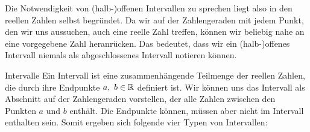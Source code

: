\documentclass[../../main.tex]{subfiles}
\begin{document}
	Die Notwendigkeit von (halb-)offenen Intervallen zu sprechen liegt also in den reellen Zahlen selbst begründet. Da wir auf der Zahlengeraden mit jedem Punkt, den wir uns aussuchen, auch eine reelle Zahl treffen, können wir beliebig nahe an eine vorgegebene Zahl heranrücken. Das bedeutet, dass wir ein (halb-)offenes Intervall niemals als abgeschlossenes Intervall notieren können.
\begin{samepage}
	\begin{nutshell}{Intervalle}
		Ein Intervall ist eine zusammenhängende Teilmenge der reellen Zahlen, die durch ihre Endpunkte $a,\ b\in\mathbb{R}$ definiert ist. Wir können uns das Intervall als Abschnitt auf der Zahlengeraden vorstellen, der alle Zahlen zwischen den Punkten $a$ und $b$ enthält. Die Endpunkte können, müssen aber nicht im Intervall enthalten sein. Somit ergeben sich folgende vier Typen von Intervallen:
		

\end{nutshell}
\end{samepage}
\end{document}
